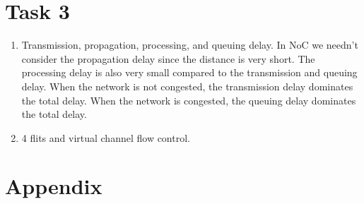 \documentclass{article}
\begin{document}
\section*{Task 3}
\begin{enumerate}
	\item Transmission, propagation, processing, and queuing delay. In NoC we needn't consider the propagation delay since the distance is very short. The processing delay is also very small compared to the transmission and queuing delay. When the network is not congested, the transmission delay dominates the total delay. When the network is congested, the queuing delay dominates the total delay.
	\item 4 flits and virtual channel flow control.
\end{enumerate}


\section*{Appendix}
\end{document}

